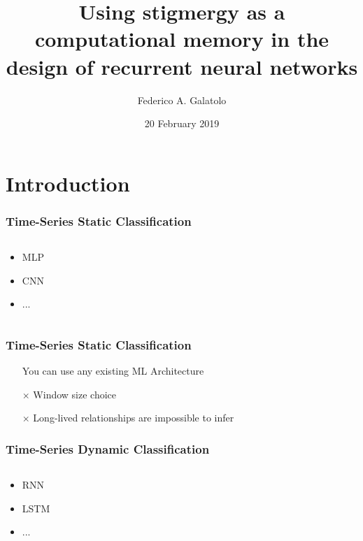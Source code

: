 \documentclass{beamer}
\title{Using stigmergy as a computational memory in the design of recurrent neural networks}
\author{Federico A. Galatolo}
\institute {
Department of Information Engineering\\
University of Pisa
}
\date{20 February 2019}
\begin{document}
\maketitle

\section{Introduction}
\begin{frame}
    \frametitle{Time-Series Static Classification}
    \begin{columns}
        \begin{column}{0.2\textwidth}
            \begin{itemize}
                \item MLP
                \item CNN
                \item ...
            \end{itemize}
        \end{column}
        \begin{column}{0.8\textwidth}
            
        \end{column}
    \end{columns}
\end{frame}

\begin{frame}
    \frametitle{Time-Series Static Classification}
    \begin{itemize}
        \item[\checkmark] You can use any existing ML Architecture
        \item[$\times$] Window size choice
        \item[$\times$] Long-lived relationships are impossible to infer 
    \end{itemize} 
\end{frame}


\begin{frame}
    \frametitle{Time-Series Dynamic Classification}
    \begin{columns}
        \begin{column}{0.2\textwidth}
            \begin{itemize}
                \item RNN
                \item LSTM
                \item ...
            \end{itemize}
        \end{column}
        \begin{column}{0.8\textwidth}
            
        \end{column}
    \end{columns}
\end{frame}
\end{document}
